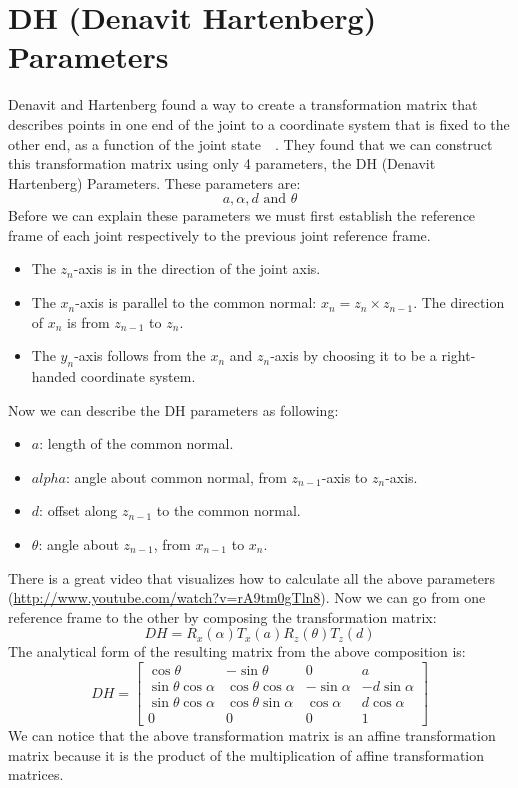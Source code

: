 \section{DH (Denavit \- Hartenberg) Parameters}
Denavit and Hartenberg found a way to create a transformation matrix that describes points in one end of the joint to a coordinate system that is fixed to the other end, as a function of the joint state~\cite{dhparam1}~\cite{introroboticscraigbook}. They found that we can construct this transformation matrix using only 4 parameters, the DH (Denavit \- Hartenberg) Parameters. These parameters are: 
\[a,\alpha,d \text{ and } \theta\]
Before we can explain these parameters we must first establish the reference frame of each joint respectively to the previous joint reference frame.
\begin{itemize}
\item The \(z_n\)-axis is in the direction of the joint axis. 
\item The \(x_n\)-axis is parallel to the common normal: \(x_n = z_n \times z_{n-1}\). The direction of \(x_n\) is from \(z_{n - 1}\) to \(z_n\).
\item The \(y_n\)-axis follows from the \(x_n\)  and \(z_n\)-axis by choosing it to be a right-handed coordinate system.
\end{itemize}
Now we can describe the DH parameters as following:
\begin{itemize}
\item\(a\): length of the common normal.
\item\(alpha\): angle about common normal, from \(z_{n-1}\)-axis to \(z_n\)-axis.
\item\(d\): offset along \(z_{n-1}\) to the common normal.
\item\(\theta\): angle about \(z_{n-1}\), from \(x_{n-1}\) to \(x_n\).
\end{itemize}
There is a great video that visualizes how to calculate all the above parameters (\url{http://www.youtube.com/watch?v=rA9tm0gTln8}).
Now we can go from one reference frame to the other by composing the transformation matrix:
\[DH = R_x(\alpha)T_x(a)R_z(\theta)T_z(d)\]
The analytical form of the resulting matrix from the above composition is:
\[
DH = 
\begin{bmatrix}
\cos\theta & -\sin\theta & 0 & a\\
\sin\theta\cos\alpha & \cos\theta\cos\alpha & -\sin\alpha & -d\sin\alpha\\
\sin\theta\cos\alpha & \cos\theta\sin\alpha & \cos\alpha & d\cos\alpha\\
0 & 0 & 0 & 1
\end{bmatrix}
\]
We can notice that the above transformation matrix is an affine transformation matrix because it is the product of the multiplication of affine transformation matrices.


